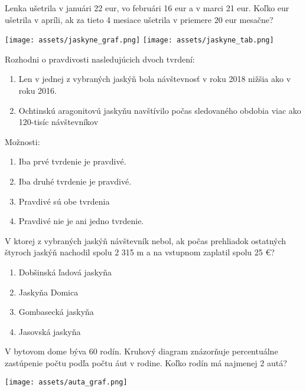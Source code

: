 \begin{example}
	Lenka ušetrila v januári 22 eur, vo februári 16 eur a v marci 21 eur. Koľko eur ušetrila v apríli, ak za tieto 4 mesiace ušetrila v priemere 20 eur mesačne? 
\end{example}

\begin{center}
	\texttt{[image: assets/jaskyne\_graf.png]}
	\texttt{[image: assets/jaskyne\_tab.png]}
	
\end{center}

\begin{example}
	Rozhodni o pravdivosti nasledujúcich dvoch tvrdení:
	\begin{enumerate}
		\item Len v jednej z vybraných jaskýň bola návštevnosť v roku 2018 nižšia ako v roku 2016.
		\item Ochtinskú aragonitovú jaskyňu navštívilo počas sledovaného obdobia viac ako 120-tisíc
		návštevníkov
	\end{enumerate}
	
	Možnosti:
	\begin{enumerate}
		\item Iba prvé tvrdenie je pravdivé.
		\item Iba druhé tvrdenie je pravdivé.
		\item Pravdivé sú obe tvrdenia
		\item Pravdivé nie je ani jedno tvrdenie.
	\end{enumerate}
\end{example}

\begin{example}
	V ktorej z vybraných jaskýň návštevník nebol, ak počas prehliadok ostatných štyroch jaskýň nachodil spolu 2 315 m a na vstupnom zaplatil spolu 25 €?
	
	\begin{enumerate}
		\item Dobšinská ľadová jaskyňa
		\item Jaskyňa Domica
		\item Gombasecká jaskyňa
		\item Jasovská jaskyňa
	\end{enumerate}
\end{example}

\begin{example}
	V bytovom dome býva 60 rodín. Kruhový diagram znázorňuje percentuálne zastúpenie počtu podľa počtu áut v rodine. Koľko rodín má najmenej 2 autá?
	
	\begin{center}
		\texttt{[image: assets/auta\_graf.png]}
	\end{center}
\end{example}


